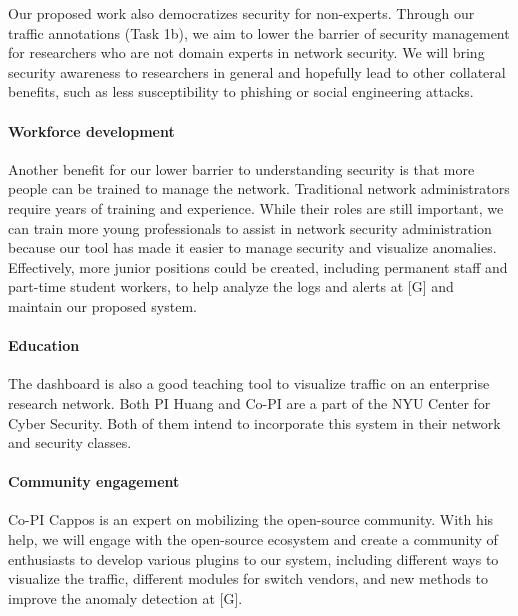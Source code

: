 Our proposed work also democratizes security for non-experts. Through our traffic annotations (Task 1b), we aim to lower the barrier of security management for researchers who are not domain experts in network security. We will bring security awareness to researchers in general and hopefully lead to other collateral benefits, such as less susceptibility to phishing or social engineering attacks.


\paragraph{Workforce development}
Another benefit for our lower barrier to understanding security is that more people can be trained to manage the network. Traditional network administrators require years of training and experience. While their roles are still important, we can train more young professionals to assist in network security administration because our tool has made it easier to manage security and visualize anomalies. Effectively, more junior positions could be created, including permanent staff and part-time student workers, to help analyze the logs and alerts at [G] and maintain our proposed system.

\paragraph{Education}
The dashboard is also a good teaching tool to visualize traffic on an enterprise research network. Both PI Huang and Co-PI are a part of the NYU Center for Cyber Security. Both of them intend to incorporate this system in their network and security classes.

\paragraph{Community engagement}
Co-PI Cappos is an expert on mobilizing the open-source community. With his help, we will engage with the open-source ecosystem and create a community of enthusiasts to develop various plugins to our system, including different ways to visualize the traffic, different modules for switch vendors, and new methods to improve the anomaly detection at [G].

